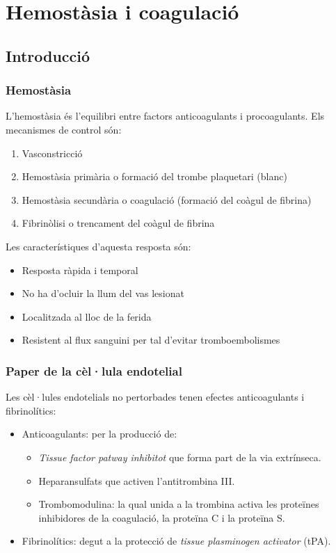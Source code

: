 \section{Hemostàsia i coagulació}

\subsection{Introducció}
\subsubsection{Hemostàsia}
L'hemostàsia és l'equilibri entre factors anticoagulants i
procoagulants. Els mecanismes de control són:
\begin{enumerate}
\item Vasconstricció
\item Hemostàsia primària o formació del trombe plaquetari (blanc)
\item Hemostàsia secundària o coagulació (formació del coàgul de
  fibrina)
\item Fibrinòlisi o trencament del coàgul de fibrina
\end{enumerate}

Les característiques d'aquesta resposta són:
\begin{itemize}
\item Resposta ràpida i temporal
\item No ha d'ocluir la llum del vas lesionat
\item Localitzada al lloc de la ferida
\item Resistent al flux sanguini per tal d'evitar tromboembolismes
\end{itemize}

\subsubsection{Paper de la cèl·lula endotelial}
Les cèl·lules endotelials no pertorbades tenen efectes anticoagulants
i fibrinolítics:
\begin{itemize}
\item Anticoagulants: per la producció de:
  \begin{itemize}
  \item \textit{Tissue factor patway inhibitot} que forma part de la
    via extrínseca.
  \item Heparansulfats que activen l'antitrombina III.
  \item Trombomodulina: la qual unida a la trombina activa les
    proteïnes inhibidores de la coagulació, la proteïna C i la
    proteïna S.
  \end{itemize}

\item Fibrinolítics: degut a la protecció de \textit{tissue
    plasminogen activator} (tPA).
\end{itemize}

